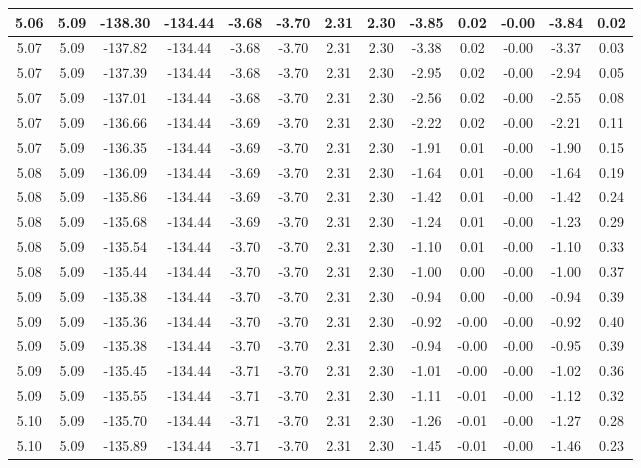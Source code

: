\begin{table}[htbp]
\begin{adjustbox}{angle=90}
\begin{tabular}{|c|c|c|c|c|c|c|c|c|c|c|c|c|}
 5.06 & 5.09 & -138.30 & -134.44 & -3.68 & -3.70 & 2.31 & 2.30 & -3.85 & 0.02 & -0.00 & -3.84 & 0.02\\ \hline
 5.07 & 5.09 & -137.82 & -134.44 & -3.68 & -3.70 & 2.31 & 2.30 & -3.38 & 0.02 & -0.00 & -3.37 & 0.03\\ \hline
 5.07 & 5.09 & -137.39 & -134.44 & -3.68 & -3.70 & 2.31 & 2.30 & -2.95 & 0.02 & -0.00 & -2.94 & 0.05\\ \hline
 5.07 & 5.09 & -137.01 & -134.44 & -3.68 & -3.70 & 2.31 & 2.30 & -2.56 & 0.02 & -0.00 & -2.55 & 0.08\\ \hline
 5.07 & 5.09 & -136.66 & -134.44 & -3.69 & -3.70 & 2.31 & 2.30 & -2.22 & 0.02 & -0.00 & -2.21 & 0.11\\ \hline
 5.07 & 5.09 & -136.35 & -134.44 & -3.69 & -3.70 & 2.31 & 2.30 & -1.91 & 0.01 & -0.00 & -1.90 & 0.15\\ \hline
 5.08 & 5.09 & -136.09 & -134.44 & -3.69 & -3.70 & 2.31 & 2.30 & -1.64 & 0.01 & -0.00 & -1.64 & 0.19\\ \hline
 5.08 & 5.09 & -135.86 & -134.44 & -3.69 & -3.70 & 2.31 & 2.30 & -1.42 & 0.01 & -0.00 & -1.42 & 0.24\\ \hline
 5.08 & 5.09 & -135.68 & -134.44 & -3.69 & -3.70 & 2.31 & 2.30 & -1.24 & 0.01 & -0.00 & -1.23 & 0.29\\ \hline
 5.08 & 5.09 & -135.54 & -134.44 & -3.70 & -3.70 & 2.31 & 2.30 & -1.10 & 0.01 & -0.00 & -1.10 & 0.33\\ \hline
 5.08 & 5.09 & -135.44 & -134.44 & -3.70 & -3.70 & 2.31 & 2.30 & -1.00 & 0.00 & -0.00 & -1.00 & 0.37\\ \hline
 5.09 & 5.09 & -135.38 & -134.44 & -3.70 & -3.70 & 2.31 & 2.30 & -0.94 & 0.00 & -0.00 & -0.94 & 0.39\\ \hline
 5.09 & 5.09 & -135.36 & -134.44 & -3.70 & -3.70 & 2.31 & 2.30 & -0.92 & -0.00 & -0.00 & -0.92 & 0.40\\ \hline
 5.09 & 5.09 & -135.38 & -134.44 & -3.70 & -3.70 & 2.31 & 2.30 & -0.94 & -0.00 & -0.00 & -0.95 & 0.39\\ \hline
 5.09 & 5.09 & -135.45 & -134.44 & -3.71 & -3.70 & 2.31 & 2.30 & -1.01 & -0.00 & -0.00 & -1.02 & 0.36\\ \hline
 5.09 & 5.09 & -135.55 & -134.44 & -3.71 & -3.70 & 2.31 & 2.30 & -1.11 & -0.01 & -0.00 & -1.12 & 0.32\\ \hline
 5.10 & 5.09 & -135.70 & -134.44 & -3.71 & -3.70 & 2.31 & 2.30 & -1.26 & -0.01 & -0.00 & -1.27 & 0.28\\ \hline
 5.10 & 5.09 & -135.89 & -134.44 & -3.71 & -3.70 & 2.31 & 2.30 & -1.45 & -0.01 & -0.00 & -1.46 & 0.23\\ \hline

\end{tabular}
\end{adjustbox}
\end{table}
